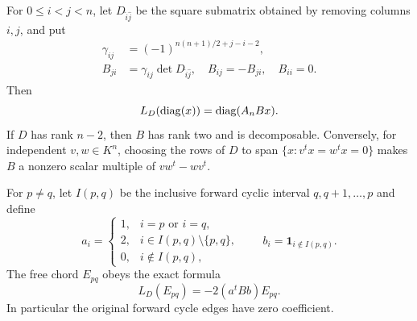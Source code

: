 \begin{lemma}\label{lem:cycle}
For $0\le i<j<n$, let $D_{\widehat{i}\widehat{j}}$ be the
square submatrix obtained by removing columns $i,j$, and put
\begin{equation}\label{eq:gamma}
\begin{aligned}
 \gamma_{ij}&=(-1)^{n(n+1)/2+j-i-2},\\
 B_{ji}&=\gamma_{ij}\det D_{\widehat{i}\widehat{j}},
 \quad B_{ij}=-B_{ji},\quad B_{ii}=0.
\end{aligned}
\end{equation}
Then
\begin{equation}\label{eq:cycleDiag}
 L_D(\operatorname{diag}(x))=\operatorname{diag}(A_nB x).
\end{equation}
If $D$ has rank $n-2$, then $B$ has rank two and is decomposable.
Conversely, for independent $v,w\in K^n$, choosing the rows of
$D$ to span $\{x:v^tx=w^tx=0\}$ makes
$B$ a nonzero scalar multiple of $vw^t-wv^t$.

For $p\ne q$, let $I(p,q)$ be the inclusive forward cyclic
interval $q,q+1,\ldots,p$ and define
\begin{equation}\label{eq:ab}
 a_i=\begin{cases}
 1,&i=p\text{ or }i=q,\\2,&i\in I(p,q)\setminus\{p,q\},\\0,&i\notin I(p,q),
 \end{cases}\qquad
 b_i=\mathbf1_{i\notin I(p,q)}.
\end{equation}
The free chord $E_{pq}$ obeys the exact formula
\begin{equation}\label{eq:cycleChord}
 L_D(E_{pq})=-2(a^tBb)E_{pq}.
\end{equation}
In particular the original forward cycle edges have zero
coefficient.
\end{lemma}
